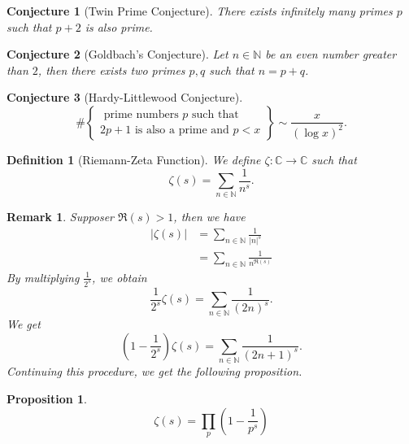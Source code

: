 \documentclass{article}
\newtheorem{proposition}{Proposition}[section]
\newtheorem{definition}{Definition}[section]
\newtheorem{remark}{Remark}[section]
\newtheorem{conjecture}{Conjecture}[section]
\newcommand{\N}[0]{\mathbb{N}}
\newcommand{\C}[0]{\mathbb{C}}
\begin{document}
\begin{conjecture}[Twin Prime Conjecture]
There exists infinitely many primes $p$ such that $p+2$ is also prime.
\end{conjecture}

\begin{conjecture}[Goldbach's Conjecture]
Let $n\in\N$ be an even number greater than $2$, then there exists two primes $p,q$ such that $n=p+q$.
\end{conjecture}

\begin{conjecture}[Hardy-Littlewood Conjecture]
\begin{equation*}
\#\left\{ \substack{\text{ prime numbers $p$ such that}\\\text{$2p+1$ is also a prime and $p<x$}}\right\}  \sim {\frac x {(\log x)^2}}.
\end{equation*}
\end{conjecture}

\begin{definition}[Riemann-Zeta Function]
We define $\zeta:\C\to\C$ such that
\begin{equation*}
\zeta(s) = \sum_{n\in\N}{\frac 1 {n^s}}.
\end{equation*}
\end{definition}

\begin{remark}
Supposer $\Re(s)>1$, then we have
\begin{align*}
\vert \zeta(s)\vert & = \sum_{n\in\N} {\frac 1 {\vert n \vert^s}}\\
& = \sum_{n\in\N} {\frac 1 {n ^{\Re(s)}}}
\end{align*}
By multiplying ${\frac 1 {2^s}}$, we obtain
\begin{equation*}
{\frac 1 {2^s}}\zeta(s) = \sum_{n\in\N} {\frac 1 {(2n)^s}}.
\end{equation*}
We get
\begin{equation*}
  \left(1-{\frac 1 {2^s}}\right)\zeta(s) = \sum_{n\in\N} {\frac 1 {(2n+1)^s}}.
\end{equation*}
Continuing this procedure, we get the following proposition.
\end{remark}

\begin{proposition}
\begin{equation*}
\zeta(s) = \prod_{p}\left(1 - {\frac 1 {p^s}}\right)
\end{equation*}
\end{proposition}
\end{document}
